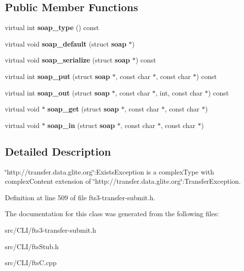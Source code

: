 \subsection*{Public Member Functions}
\begin{DoxyCompactItemize}
\item 
virtual int {\bfseries soap\_\-type} () const \label{classtransfer____ExistsException_aab0cb74d2b9fa9a09b9001d6edbcb5c9}

\item 
virtual void {\bfseries soap\_\-default} (struct {\bf soap} $\ast$)\label{classtransfer____ExistsException_a862e4c622d5d767654ce249beb28b1f5}

\item 
virtual void {\bfseries soap\_\-serialize} (struct {\bf soap} $\ast$) const \label{classtransfer____ExistsException_af2dab9b991dab55caf5a3a9cd889c98d}

\item 
virtual int {\bfseries soap\_\-put} (struct {\bf soap} $\ast$, const char $\ast$, const char $\ast$) const \label{classtransfer____ExistsException_a6fe097bf3b01663bac80fe1528d544d8}

\item 
virtual int {\bfseries soap\_\-out} (struct {\bf soap} $\ast$, const char $\ast$, int, const char $\ast$) const \label{classtransfer____ExistsException_ab6203c01116d7206b28be4101bdbc77f}

\item 
virtual void $\ast$ {\bfseries soap\_\-get} (struct {\bf soap} $\ast$, const char $\ast$, const char $\ast$)\label{classtransfer____ExistsException_af350641b05672db2db3c72be655ffc64}

\item 
virtual void $\ast$ {\bfseries soap\_\-in} (struct {\bf soap} $\ast$, const char $\ast$, const char $\ast$)\label{classtransfer____ExistsException_a334ea62a90cab00abb84c2ce7ce34f1e}

\end{DoxyCompactItemize}


\subsection{Detailed Description}
\char`\"{}http://transfer.data.glite.org\char`\"{}:ExistsException is a complexType with complexContent extension of \char`\"{}http://transfer.data.glite.org\char`\"{}:TransferException. 

Definition at line 509 of file fts3-\/transfer-\/submit.h.



The documentation for this class was generated from the following files:\begin{DoxyCompactItemize}
\item 
src/CLI/fts3-\/transfer-\/submit.h\item 
src/CLI/ftsStub.h\item 
src/CLI/ftsC.cpp\end{DoxyCompactItemize}
